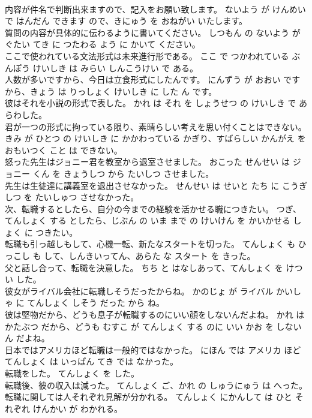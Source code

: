\documentclass[8pt]{extreport}
\begin{document}
\begin{CJK}{UTF8}{min}
\\	内容が件名で判断出来ますので、記入をお願い致します。	ないよう が けんめい で はんだん できます ので、きにゅう を おねがい いたします。	
\\	質問の内容が具体的に伝わるように書いてください。	しつもん の ないよう が ぐたい てき に つたわる よう に かいて ください。	
\\	ここで使われている文法形式は未来進行形である。	ここ で つかわれている ぶんぽう けいしき は みらい しんこうけい で ある。	
\\	人数が多いですから、今日は立食形式にしたんです。	にんずう が おおい です から、きょう は りっしょく けいしき に した ん です。	
\\	彼はそれを小説の形式で表した。	かれ は それ を しょうせつ の けいしき で あらわした。	
\\	君が一つの形式に拘っている限り、素晴らしい考えを思い付くことはできない。	きみ が ひとつ の けいしき に かかわっている かぎり、すばらしい かんがえ を おもいつく こと は できない。	
\\	怒った先生はジョニー君を教室から退室させました。	おこった せんせい は ジョニー くん を きょうしつ から たいしつ させました。	
\\	先生は生徒達に講義室を退出させなかった。	せんせい は せいと たち に こうぎしつ を たいしゅつ させなかった。	
\\	次、転職するとしたら、自分の今までの経験を活かせる職につきたい。	つぎ、てんしょく する としたら、じぶん の いま まで の けいけん を かいかせる しょく に つきたい。	
\\	転職も引っ越しもして、心機一転、新たなスタートを切った。	てんしょく も ひっこし も して、しんきいってん、あらた な スタート を きった。	
\\	父と話し合って、転職を決意した。	ちち と はなしあって、てんしょく を けつい した。	
\\	彼女がライバル会社に転職しそうだったからね。	かのじょ が ライバル かいしゃ に てんしょく しそう だった から ね。	
\\	彼は堅物だから、どうも息子が転職するのにいい顔をしないんだよね。	かれ は かたぶつ だから、どうも むすこ が てんしょく する のに いい かお を しない ん だよね。	
\\	日本ではアメリカほど転職は一般的ではなかった。	にほん では アメリカ ほど てんしょく は いっぱん てき では なかった。	
\\	転職をした。	てんしょく を した。	
\\	転職後、彼の収入は減った。	てんしょく ご、かれ の しゅうにゅう は へった。	
\\	転職に関しては人それぞれ見解が分かれる。	てんしょく にかんして は ひと それぞれ けんかい が わかれる。	

\end{CJK}
\end{document}
